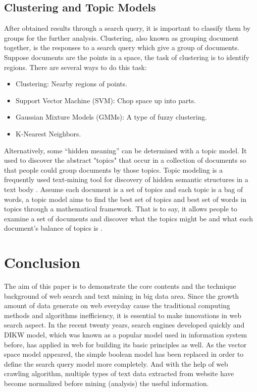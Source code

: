 \documentclass[sigconf]{acmart}
\begin{document}
\subsection{Clustering and Topic Models}
After obtained results through a search query, it is important to classify them by groups for the further analysis. Clustering, also known as grouping document together, is the responses to a search query which give a group of documents. Suppose documents are the points in a space, the task of clustering is to identify regions. There are several ways to do this task:
\begin{itemize}
\item Clustering: Nearby regions of points.
\item Support Vector Machine (SVM): Chop space up into parts.
\item Gaussian Mixture Models (GMMs): A type of fuzzy clustering.
\item K-Nearest Neighbors.
\end{itemize}

Alternatively, some ``hidden meaning'' can be determined with a topic model. It used to discover the abstract "topics" that occur in a collection of documents so that people could group documents by those topics. Topic modeling is a frequently used text-mining tool for discovery of hidden semantic structures in a text body \cite{editor11}. Assume each document is a set of topics and each topic is a bag of words, a topic model aims to find the best set of topics and best set of words in topics through a mathematical framework. That is to say, it allows people to examine a set of documents and discover what the topics might be and what each document's balance of topics is \cite{editor11}.

\section{Conclusion}

The aim of this paper is to demonstrate the core contents and the technique background of web search and text mining in big data area. Since the growth amount of data generate on web everyday cause the traditional computing methods and algorithms inefficiency, it is essential to make innovations in web search aspect. In the recent twenty years, search engines developed quickly and DIKW model, which was known as a popular model used in information system before, has applied in web for building its basic principles as well. As the vector space model appeared, the simple boolean model has been replaced in order to define the search query model more completely. And with the help of web crawling algorithm, multiple types of text data extracted from website have become normalized before mining (analysis) the useful information.
\end{document}
